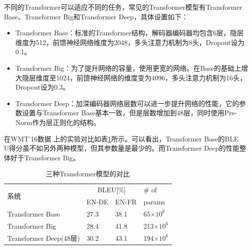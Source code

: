 \parinterval 不同的Transformer可以适应不同的任务，常见的Transformer模型有Transformer Base、Transformer Big和Transformer Deep\cite{NIPS2017_7181,WangLearning}，具体设置如下：

\begin{itemize}
\vspace{0.5em}
\item  Transformer Base：标准的Transformer结构，解码器编码器均包含6层，隐层维度为512，前馈神经网络维度为2048，多头注意力机制为8头，Dropout设为0.1。
\vspace{0.5em}
\item  Transformer Big：为了提升网络的容量，使用更宽的网络。在Base的基础上增大隐层维度至1024，前馈神经网络的维度变为4096，多头注意力机制为16头，Dropout设为0.3。
\vspace{0.5em}
\item Transformer Deep：加深编码器网络层数可以进一步提升网络的性能，它的参数设置与Transformer Base基本一致，但是层数增加到48层，同时使用Pre-Norm作为层正则化的结构。
\vspace{0.5em}
\end{itemize}

\parinterval 在WMT'16数据 上的实验对比如表\ref{tab:6-13}所示。可以看出，Transformer Base的BLE\\U得分虽不如另外两种模型，但其参数量是最少的。而Transformer Deep的性能整体好于Transformer Big。

\begin{table}[htp]
\centering
\caption{三种Transformer模型的对比}
\label{tab:6-13}
\begin{tabular}{l | l l l}
\multirow{2}{*}{系统}   & \multicolumn{2}{c}{BLEU[\%]} & \# of \\
                      & EN-DE  & EN-FR  &    params                              \\ \hline
Transformer Base      & 27.3            & 38.1            & 65$\times 10^{6}$                \\
Transformer Big       & 28.4            & 41.8            & 213$\times 10^{6}$               \\
Transformer Deep(48层) & 30.2            & 43.1            & 194$\times 10^{6}$              \\
\end{tabular}
\end{table}


